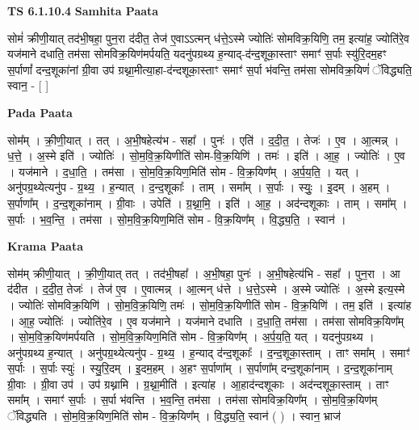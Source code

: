 \documentclass[17pt]{extarticle}
\begin{document}
\textbf{TS 6.1.10.4 } \newline
\textbf{Samhita Paata} \newline

सोमं॑ क्रीणी॒यात् तद॑भी॒षहा॒ पुन॒रा द॑दीत॒ तेज॑ ए॒वाऽऽत्मन् ध॑त्ते॒ऽस्मे ज्योतिः॑ सोमविक्र॒यिणि॒ तम॒ इत्या॑ह॒ ज्योति॑रे॒व यज॑माने दधाति॒ तम॑सा सोमविक्र॒यिण॑मर्पयति॒ यदनु॑पग्रथ्य ह॒न्याद्-द॑न्द॒शूका॒स्ताꣳ समाꣳ॑ स॒र्पाः स्यु॑रि॒दम॒हꣳ स॒र्पाणां᳚ दन्द॒शूका॑नां ग्री॒वा उप॑ ग्रथ्ना॒मीत्या॒हा-द॑न्दशूका॒स्ताꣳ समाꣳ॑ स॒र्पा भ॑वन्ति॒ तम॑सा सोमविक्र॒यिणं॑ ॅविद्ध्यति॒ स्वान॒ - [  ] \newline

\textbf{Pada Paata} \newline

सोम᳚म् । क्री॒णी॒यात् । तत् । अ॒भी॒षहेत्य॑भ - सहा᳚ । पुनः॑ । एति॑ । द॒दी॒त॒ । तेजः॑ । ए॒व । आ॒त्मन्न् । ध॒त्ते॒ । अ॒स्मे इति॑ । ज्योतिः॑ । सो॒म॒वि॒क्र॒यिणीति॑ सोम-वि॒क्र॒यिणि॑ । तमः॑ । इति॑ । आ॒ह॒ । ज्योतिः॑ । ए॒व । यज॑माने । द॒धा॒ति॒ । तम॑सा । सो॒म॒वि॒क्र॒यिण॒मिति॑ सोम - वि॒क्र॒यिण᳚म् । अ॒र्प॒य॒ति॒ । यत् । अनु॑पग्र॒थ्येत्यनु॑प - ग्र॒थ्य॒ । ह॒न्यात् । द॒न्द॒शूकाः᳚ । ताम् । समा᳚म् । स॒र्पाः । स्युः॒ । इ॒दम् । अ॒हम् । स॒र्पाणा᳚म् । द॒न्द॒शूका॑नाम् । ग्री॒वाः । उपेति॑ । ग्र॒थ्ना॒मि॒ । इति॑ । आ॒ह॒ । अद॑न्दशूकाः । ताम् । समा᳚म् । स॒र्पाः । भ॒व॒न्ति॒ । तम॑सा । सो॒म॒वि॒क्र॒यिण॒मिति॑ सोम - वि॒क्र॒यिण᳚म् । वि॒द्ध्य॒ति॒ । स्वान॑ ।  \newline


\textbf{Krama Paata} \newline

सोम॑म् क्रीणी॒यात् । क्री॒णी॒यात् तत् । तद॑भी॒षहा᳚ । अ॒भी॒षहा॒ पुनः॑ । अ॒भी॒षहेत्य॑भि - सहा᳚ । पुन॒रा । आ द॑दीत । द॒दी॒त॒ तेजः॑ । तेज॑ ए॒व । ए॒वात्मन्न् । आ॒त्मन् ध॑त्ते । ध॒त्ते॒ऽस्मे । अ॒स्मे ज्योतिः॑ । अ॒स्मे इत्य॒स्मे । ज्योतिः॑ सोमविक्र॒यिणि॑ । सो॒म॒वि॒क्र॒यिणि॒ तमः॑ । सो॒म॒वि॒क्र॒यिणीति॑ सोम - वि॒क्र॒यिणि॑ । तम॒ इति॑ । इत्या॑ह । आ॒ह॒ ज्योतिः॑ । ज्योति॑रे॒व । ए॒व यज॑माने । यज॑माने दधाति । द॒धा॒ति॒ तम॑सा । तम॑सा सोमविक्र॒यिण᳚म् । सो॒म॒वि॒क्र॒यिण॑मर्पयति । सो॒म॒वि॒क्र॒यिण॒मिति॑ सोम - वि॒क्र॒यिण᳚म् । अ॒र्प॒य॒ति॒ यत् । यदनु॑पग्रथ्य । अनु॑पग्रथ्य ह॒न्यात् । अनु॑पग्र॒थ्येत्यनु॑प - ग्र॒थ्य॒ । ह॒न्याद् द॑न्द॒शूकाः᳚ । द॒न्द॒शूका॒स्ताम् । ताꣳ समा᳚म् । समाꣳ॑ स॒र्पाः । स॒र्पाः स्युः॑ । स्यु॒रि॒दम् । इ॒दम॒हम् । अ॒हꣳ स॒र्पाणा᳚म् । स॒र्पाणा᳚म् दन्द॒शूका॑नाम् । द॒न्द॒शूका॑नाम् ग्री॒वाः । ग्री॒वा उप॑ । उप॑ ग्रथ्नामि । ग्र॒थ्ना॒मीति॑ । इत्या॑ह । आ॒हाद॑न्दशूकाः । अद॑न्दशूका॒स्ताम् । ताꣳ समा᳚म् । समाꣳ॑ स॒र्पाः । स॒र्पा भ॑वन्ति । भ॒व॒न्ति॒ तम॑सा । तम॑सा सोमविक्र॒यिण᳚म् । सो॒म॒वि॒क्र॒यिण॑म् ॅविद्ध्यति । सो॒म॒वि॒क्र॒यिण॒मिति॑ सोम - वि॒क्र॒यिण᳚म् । वि॒द्ध्य॒ति॒ स्वान॑ ( ) । स्वान॒ भ्राज॑ \newline
\end{document}
